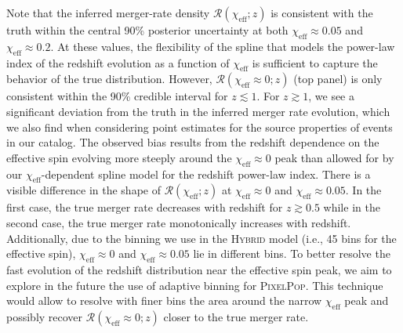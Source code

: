 \documentclass[twocolumn, twocolappendix]{aastex631}
\newcommand{\chieff}{\ensuremath{\chi_\mathrm{eff}}}
\newcommand{\PixelPop}{\textsc{PixelPop}\xspace}
\newcommand{\Hybrid}{\textsc{Hybrid}\xspace}
\begin{document}
Note that the inferred merger-rate density $\mathcal{R}(\chieff; z)$ is consistent with the truth within the central 90\% posterior uncertainty at both $\chieff\approx0.05$ and $\chieff\approx0.2$. At these values, the flexibility of the spline that models the power-law index of the redshift evolution as a function of $\chieff$ is sufficient to capture the behavior of the true distribution. However, $\mathcal{R}(\chieff\approx0; z)$ (top panel) is only consistent within the 90\% credible interval for $z \lesssim 1$. For $z \gtrsim 1$, we see a significant deviation from the truth in the inferred merger rate evolution, which we also find when considering point estimates for the source properties of events in our catalog. The observed bias results from the redshift dependence on the effective spin evolving more steeply around the $\chieff\approx0$ peak than allowed for by our $\chieff$-dependent spline model for the redshift power-law index. There is a visible difference in the shape of $\mathcal{R}(\chieff;z)$ at $\chieff\approx0$ and $\chieff\approx0.05$. In the first case, the true merger rate decreases with redshift for $z\gtrsim 0.5$ while in the second case, the true merger rate monotonically increases with redshift. Additionally, due to the binning we use in the \Hybrid model (i.e., 45 bins for the effective spin), $\chieff\approx0$ and $\chieff\approx0.05$ lie in different bins. To better resolve the fast evolution of the redshift distribution near the effective spin peak, we aim to explore in the future the use of adaptive binning for \PixelPop. This technique would allow to resolve with finer bins the area around the narrow $\chieff$ peak and possibly recover $\mathcal{R}(\chieff\approx0; z)$ closer to the true merger rate.



\end{document}
